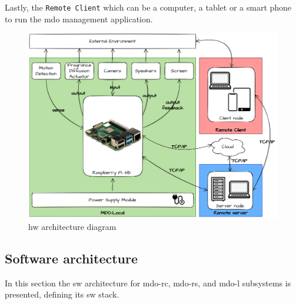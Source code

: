 Lastly, the \texttt{Remote Client} which can be a computer, a tablet or a smart phone to run the \gls{mdo} management application.
%
\begin{figure}[htb!]
\centering
    \includegraphics[width=0.8\columnwidth]{./img/HW_Architecture.png}
  \caption{\gls{hw} architecture diagram}%
\label{fig:hw-arch}
\end{figure}
%
%
\subsection{Software architecture}
\label{sec:softw-arch}
In this section the \gls{sw} architecture for \gls{mdo-rc}, \gls{mdo-rs}, and
\gls{mdo-l} subsystems is presented, defining its \gls{sw} stack.

